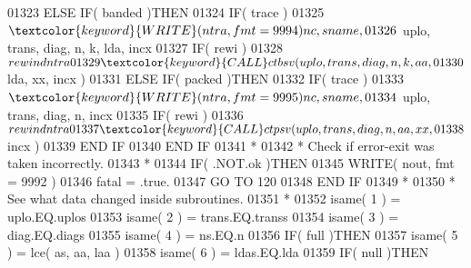\begin{DoxyCode}
01323                            \textcolor{keywordflow}{ELSE} \textcolor{keywordflow}{IF}( banded )\textcolor{keywordflow}{THEN}
01324                               \textcolor{keywordflow}{IF}( trace )
01325      $                           \textcolor{keyword}{WRITE}( ntra, fmt = 9994 )nc, sname,
01326      $                           uplo, trans, diag, n, k, lda, incx
01327                               \textcolor{keywordflow}{IF}( rewi )
01328      $                           rewind ntra
01329                               \textcolor{keyword}{CALL }ctbsv( uplo, trans, diag, n, k, aa,
01330      $                                    lda, xx, incx )
01331                            \textcolor{keywordflow}{ELSE} \textcolor{keywordflow}{IF}( packed )\textcolor{keywordflow}{THEN}
01332                               \textcolor{keywordflow}{IF}( trace )
01333      $                           \textcolor{keyword}{WRITE}( ntra, fmt = 9995 )nc, sname,
01334      $                           uplo, trans, diag, n, incx
01335                               \textcolor{keywordflow}{IF}( rewi )
01336      $                           rewind ntra
01337                               \textcolor{keyword}{CALL }ctpsv( uplo, trans, diag, n, aa, xx,
01338      $                                    incx )
01339 \textcolor{keywordflow}{                           END IF}
01340 \textcolor{keywordflow}{                        END IF}
01341 \textcolor{comment}{*}
01342 \textcolor{comment}{*                       Check if error-exit was taken incorrectly.}
01343 \textcolor{comment}{*}
01344                         \textcolor{keywordflow}{IF}( .NOT.ok )\textcolor{keywordflow}{THEN}
01345                            \textcolor{keyword}{WRITE}( nout, fmt = 9992 )
01346                            fatal = .true.
01347                            \textcolor{keywordflow}{GO TO} 120
01348 \textcolor{keywordflow}{                        END IF}
01349 \textcolor{comment}{*}
01350 \textcolor{comment}{*                       See what data changed inside subroutines.}
01351 \textcolor{comment}{*}
01352                         isame( 1 ) = uplo.EQ.uplos
01353                         isame( 2 ) = trans.EQ.transs
01354                         isame( 3 ) = diag.EQ.diags
01355                         isame( 4 ) = ns.EQ.n
01356                         \textcolor{keywordflow}{IF}( full )\textcolor{keywordflow}{THEN}
01357                            isame( 5 ) = lce( as, aa, laa )
01358                            isame( 6 ) = ldas.EQ.lda
01359                            \textcolor{keywordflow}{IF}( null )\textcolor{keywordflow}{THEN}

\end{DoxyCode}
